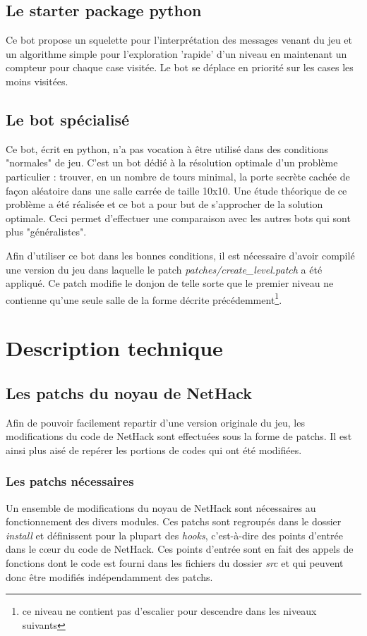 \documentclass[10pt,a4paper]{report}
\begin{document}
\section{Le starter package python}

Ce bot propose un squelette pour l'interprétation des messages venant du jeu et un algorithme simple pour l'exploration 'rapide' d'un niveau en maintenant un compteur pour chaque case visitée. Le bot se déplace en priorité sur les cases les moins visitées.

\section{Le bot spécialisé}
Ce bot, écrit en python, n'a pas vocation à être utilisé dans des conditions
"normales" de jeu. C'est un bot dédié à la résolution optimale d'un problème
particulier : trouver, en un nombre de tours minimal, la porte secrète cachée
de façon aléatoire dans une salle carrée de taille 10x10. Une étude théorique
de ce problème a été réalisée et ce bot a pour but de s'approcher de la
solution optimale. Ceci permet d'effectuer une comparaison avec les autres
bots qui sont plus "généralistes".

Afin d'utiliser ce bot dans les bonnes conditions, il est nécessaire d'avoir
compilé une version du jeu dans laquelle le patch
\emph{patches/create\_level.patch} a été appliqué. Ce patch modifie le donjon
de telle sorte que le premier niveau ne contienne qu'une seule salle de la
forme décrite précédemment\footnote{ce niveau ne contient pas d'escalier pour descendre
dans les niveaux suivants}.

\chapter{Description technique}
\section{Les patchs du noyau de NetHack}
Afin de pouvoir facilement repartir d'une version originale du jeu, les
modifications du code de NetHack sont effectuées sous la forme de patchs. Il
est ainsi plus aisé de repérer les portions de codes qui ont été modifiées.

\subsection{Les patchs nécessaires}
Un ensemble de modifications du noyau de NetHack sont nécessaires au
fonctionnement des divers modules. Ces patchs sont regroupés dans le dossier
\emph{install} et définissent pour la plupart des \emph{hooks}, c'est-à-dire des
points d'entrée dans le cœur du code de NetHack. Ces points d'entrée sont en
fait des appels de fonctions dont le code est fourni dans les fichiers du
dossier \emph{src} et qui peuvent donc être modifiés indépendamment des patchs.
\end{document}
